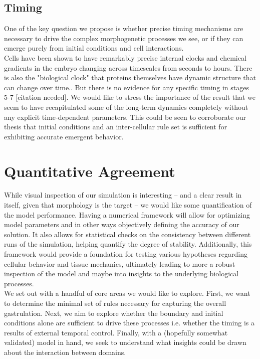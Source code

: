 

\subsection{Timing}
One of the key question we propose is whether precise timing mechanisms are necessary to drive the complex morphogenetic processes we see, or if they can emerge purely from initial conditions and cell interactions.\\
Cells have been shown to have remarkably precise internal clocks and chemical gradients in the embryo changing across timescales from seconds to hours\cite{shvartsman2008dynamics}. There is also the "biological clock"\cite{johanolsen2} that proteins themselves have dynamic structure that can change over time.\cite{johanolsen1}. But there is no evidence for any specific timing in stages 5-7 [citation needed]. We would like to stress the importance of the result that we seem to have recapitulated some of the long-term dynamics completely without any explicit time-dependent parameters. This could be seen to corroborate our thesis that initial conditions and an inter-cellular rule set is sufficient for exhibiting accurate emergent behavior.
\newpage
\section{Quantitative Agreement}

While visual inspection of our simulation is interesting -- and a clear result in itself, given that morphology is the target -- we would like some quantification of the model performance. Having a numerical framework will allow for optimizing model parameters and in other ways objectively defining the accuracy of our solution. It also allows for statistical checks on the consistency between different runs of the simulation, helping quantify the degree of stability. Additionally, this framework would provide a foundation for testing various hypotheses regarding cellular behavior and tissue mechanics, ultimately leading to more a robust inspection of the model and maybe into insights to the underlying biological processes.\\


We set out with a handful of core areas we would like to explore. First, we want to determine the minimal set of rules necessary for capturing the overall gastrulation. Next, we aim to explore whether the boundary and initial conditions alone are sufficient to drive these processes i.e. whether the timing is a results of external temporal control. Finally, with a (hopefully somewhat validated) model in hand, we seek to understand what insights could be drawn about the interaction between domains.\\


